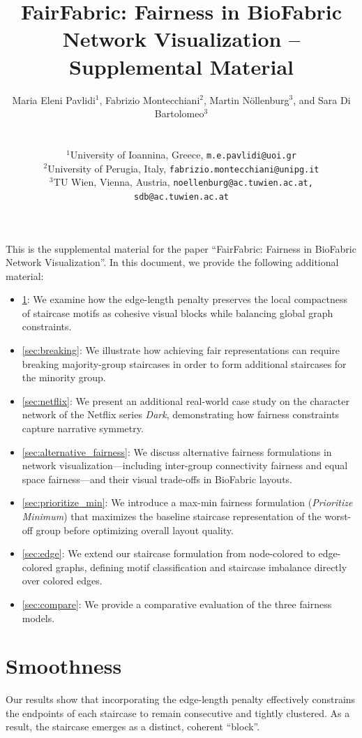 \documentclass[onecolumn]{egpubl}
\title{FairFabric: Fairness in BioFabric Network Visualization – Supplemental Material}
\author[Pavlidi, Montecchiani, N\"ollenburg, Di Bartolomeo]
{\parbox{\textwidth}{\centering Maria Eleni Pavlidi$^{1}$\orcid{0009-0009-4500-0112}, Fabrizio Montecchiani$^{2}$\orcid{0000-0002-0543-8912}, Martin N\"ollenburg$^{3}$\orcid{0000-0003-0454-3937},
  and Sara Di Bartolomeo$^{3}$\orcid{0000-0001-9517-3526}
  }
  \\
{\parbox{\textwidth}{\centering
  $^1$University of Ioannina, Greece, \texttt{m.e.pavlidi@uoi.gr}\\
  $^2$University of Perugia, Italy, \texttt{fabrizio.montecchiani@unipg.it}\\
  $^3$TU Wien, Vienna, Austria, \texttt{noellenburg@ac.tuwien.ac.at, sdb@ac.tuwien.ac.at}\smallskip
  }
}
}
\newcommand{\FairFabric}{\textsf{FairFabric}\xspace}
\begin{document}
\maketitle
\noindent This is the supplemental material for the paper ``\FairFabric: Fairness in BioFabric Network Visualization''. In this document, we provide the following additional material:

\begin{itemize}
    \item \cref{sec:appendix_smoothness}: We examine how the edge-length penalty preserves the local compactness of staircase motifs as cohesive visual blocks while balancing global graph constraints.
    \item \cref{sec:breaking}: We illustrate how achieving fair representations can require breaking majority-group staircases in order to form additional staircases for the minority group.
    \item \cref{sec:netflix}: We present an additional real-world case study on the character network of the Netflix series \emph{Dark}, demonstrating how fairness constraints capture narrative symmetry.
    \item \cref{sec:alternative_fairness}: We discuss alternative fairness formulations in network visualization—including inter-group connectivity fairness and equal space fairness—and their visual trade-offs in BioFabric layouts.
    \item \cref{sec:prioritize_min}: We introduce a max-min fairness formulation (\emph{Prioritize Minimum}) that maximizes the baseline staircase representation of the worst-off group before optimizing overall layout quality.
    \item \cref{sec:edge}: We extend our staircase formulation from node-colored to edge-colored graphs, defining motif classification and staircase imbalance directly over colored edges.
    \item \cref{sec:compare}: We provide a comparative evaluation of the three fairness models.
\end{itemize}

\section{Smoothness}
\label{sec:appendix_smoothness}

Our results show that incorporating the edge-length penalty effectively constrains the endpoints of each staircase to remain consecutive and tightly clustered. As a result, the staircase emerges as a distinct, coherent “block”.
\end{document}
